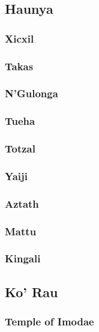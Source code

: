	\subsection{Haunya}

		\subsubsection{Xicxil}
	
		\subsubsection{Takas}
	
		\subsubsection{N'Gulonga}
	
		\subsubsection{Tueha}

		\subsubsection{Totzal}

		\subsubsection{Yaiji}

		\subsubsection{Aztath}

		\subsubsection{Mattu}

		\subsubsection{Kingali}

	\subsection{Ko' Rau}

		\subsubsection{Temple of Imodae}

